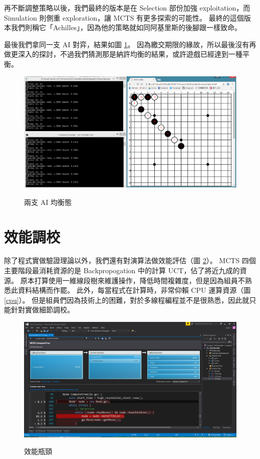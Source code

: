 \documentclass[12pt]{article}
\begin{document}
\begin{CJK}{UTF8}{bsmi}
再不斷調整策略以後，我們最終的版本是在 Selection 部份加強 exploitation，而 Simulation 則側重 exploration，讓 MCTS 有更多探索的可能性。
最終的這個版本我們則稱它「Achilles」，因為他的策略就如同阿基里斯的後腳跟一樣致命。

最後我們拿同一支 AI 對弈，結果如圖 \ref{equi}。
因為繳交期限的緣故，所以最後沒有再做更深入的探討，不過我們猜測那是納許均衡的結果，或許遊戲已經達到一種平衡。

\begin{figure}[h]
  \caption{兩支 AI 均衡態}
  \centering
  \includegraphics[width=1\textwidth]{equilibrium}
  \label{equi}
\end{figure}

\section{效能調校}
除了程式實做驗證理論以外，我們還有對演算法做效能評估（圖 \ref{performance}）。
MCTS 四個主要階段最消耗資源的是 Backpropogation 中的計算 UCT，佔了將近九成的資源。
原本打算使用一維線段樹來維護操作，降低時間複雜度，但是因為組員不熟悉此資料結構而作罷。
此外，每當程式在計算時，非常仰賴 CPU 運算資源（圖 \ref{cpu}）。
但是組員們因為技術上的困難，對於多線程編程並不是很熟悉，因此就只能針對實做細節調校。

\begin{figure}
  \caption{效能瓶頸}
  \centering
  \includegraphics[width=1.2\textwidth]{performance}
  \label{performance}
\end{figure}


\end{CJK}
\end{document}
